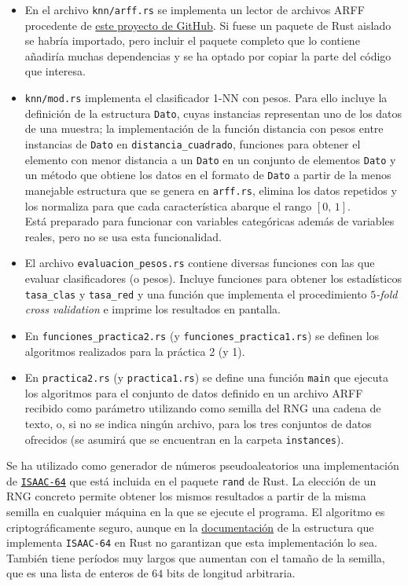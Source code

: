 \documentclass{article}
\begin{document}
\begin{itemize}
	\item En el archivo \texttt{knn/arff.rs} se implementa un lector de archivos ARFF procedente de \href{https://github.com/gyscos/varf}{este proyecto de GitHub}. Si fuese un paquete de Rust aislado se habría importado, pero incluir el paquete completo que lo contiene añadiría muchas dependencias y se ha optado por copiar la parte del código que interesa.
	\item \texttt{knn/mod.rs} implementa el clasificador 1-NN con pesos. Para ello incluye la definición de la estructura \texttt{Dato}, cuyas instancias representan uno de los datos de una muestra; la implementación de la función distancia con pesos entre instancias de \texttt{Dato} en \texttt{distancia\_cuadrado}, funciones para obtener el elemento con menor distancia a un \texttt{Dato} en un conjunto de elementos \texttt{Dato} y un método que obtiene los datos en el formato de \texttt{Dato} a partir de la menos manejable estructura que se genera en \texttt{arff.rs}, elimina los datos repetidos y los normaliza para que cada característica abarque el rango $[0,\,1]$. \\ Está preparado para funcionar con variables categóricas además de variables reales, pero no se usa esta funcionalidad.
	\item El archivo \texttt{evaluacion\_pesos.rs} contiene diversas funciones con las que evaluar clasificadores (o pesos). Incluye funciones para obtener los estadísticos \texttt{tasa\_clas} y \texttt{tasa\_red} y una función que implementa el procedimiento \textit{$5$-fold cross validation} e imprime los resultados en pantalla.
	\item En \texttt{funciones\_practica2.rs} (y \texttt{funciones\_practica1.rs}) se definen los algoritmos realizados para la práctica 2 (y 1).
	\item En \texttt{practica2.rs} (y \texttt{practica1.rs}) se define una función \texttt{main} que ejecuta los algoritmos para el conjunto de datos definido en un archivo ARFF recibido como parámetro utilizando como semilla del RNG una cadena de texto, o, si no se indica ningún archivo, para los tres conjuntos de datos ofrecidos (se asumirá que se encuentran en la carpeta \texttt{instances}).
\end{itemize}

Se ha utilizado como generador de números pseudoaleatorios una implementación de \href{http://www.burtleburtle.net/bob/rand/isaac.html}{\texttt{ISAAC-64}} que está incluida en el paquete \texttt{rand} de Rust. La elección de un RNG concreto permite obtener los mismos resultados a partir de la misma semilla en cualquier máquina en la que se ejecute el programa. El algoritmo es criptográficamente seguro, aunque en la \href{https://docs.rs/rand/0.4.2/rand/struct.Isaac64Rng.html}{documentación} de la estructura que implementa \texttt{ISAAC-64} en Rust no garantizan que esta implementación lo sea. También tiene períodos muy largos que aumentan con el tamaño de la semilla, que es una lista de enteros de $64$ bits de longitud arbitraria. \\
\end{document}
